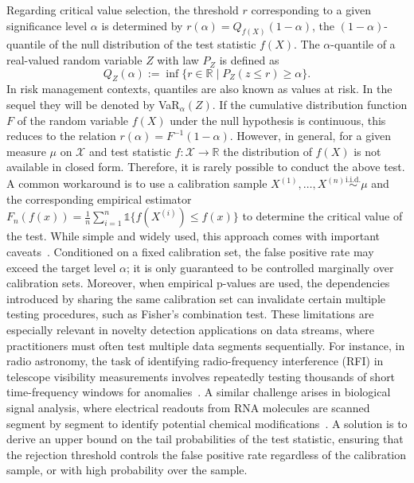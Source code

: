 \documentclass[twoside,11pt]{article}
\numberwithin{equation}{section}
\numberwithin{theorem}{section}
\newcommand{\R}{\mathbb{R}}
\newcommand{\X}{\mathcal{X}}
\begin{document}
Regarding critical value selection, the threshold $r$ corresponding to a given significance level $\alpha$ is determined by $r(\alpha)=Q_{f(X)}(1-\alpha)$, the $(1-\alpha)$-quantile of the null distribution of the test statistic $f(X)$. The $\alpha$-quantile of a real-valued random variable $Z$ with law $P_Z$ is defined as 
\begin{equation*}
    Q_{Z}(\alpha):=\inf\{r \in \R \mid P_Z(z\leq r)\geq \alpha\}.
\end{equation*}
In risk management contexts, quantiles are also known as values at risk. In the sequel they will be denoted by VaR$_\alpha(Z).$
If the cumulative distribution function $F$ of the random variable $f(X)$ under the null hypothesis is continuous, this reduces to the relation $r(\alpha)=F^{-1}(1-\alpha)$. However, in general, for a given measure $\mu$ on $\X$ and test statistic $f:\X\to\R$ the distribution of $f(X)$ is not available in closed form. Therefore, it is rarely possible to conduct the above test. A common workaround is to use a calibration sample $X^{(1)}, \ldots, X^{(n)} \overset{\text{i.i.d.}}{\sim} \mu$ and the corresponding empirical estimator $F_n(f(x))=\frac{1}{n}\sum_{i=1}^{n}\mathds{1}\{f(X^{(i)})\leq f(x)\}$ to determine the critical value of the test. While simple and widely used, this approach comes with important caveats~\citep{bates2023testing}. Conditioned on a fixed calibration set, the false positive rate may exceed the target level $\alpha$; it is only guaranteed to be controlled marginally over calibration sets. Moreover, when empirical p-values are used, the dependencies introduced by sharing the same calibration set can invalidate certain multiple testing procedures, such as Fisher’s combination test. These limitations are especially relevant in novelty detection applications on data streams, where practitioners must often test multiple data segments sequentially. For instance, in radio astronomy, the task of identifying radio-frequency interference (RFI) in telescope visibility measurements involves repeatedly testing thousands of short time-frequency windows for anomalies~\citep{arrubarrena2024novelty}. A similar challenge arises in biological signal analysis, where electrical readouts from RNA molecules are scanned segment by segment to identify potential chemical modifications~\citep{leger2021rna}. A solution is to derive an upper bound on the tail probabilities of the test statistic, ensuring that the rejection threshold controls the false positive rate regardless of the calibration sample, or with high probability over the sample.
\end{document}
